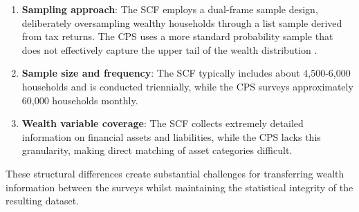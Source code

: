 \begin{enumerate}
    \item \textbf{Sampling approach}: The SCF employs a dual-frame sample design, deliberately oversampling wealthy households through a list sample derived from tax returns. The CPS uses a more standard probability sample that does not effectively capture the upper tail of the wealth distribution \citep{bryant2023general}.
    \item \textbf{Sample size and frequency}: The SCF typically includes about 4,500-6,000 households and is conducted triennially, while the CPS surveys approximately 60,000 households monthly.
    \item \textbf{Wealth variable coverage}: The SCF collects extremely detailed information on financial assets and liabilities, while the CPS lacks this granularity, making direct matching of asset categories difficult.
\end{enumerate}

These structural differences create substantial challenges for transferring wealth information between the surveys whilst maintaining the statistical integrity of the resulting dataset.
